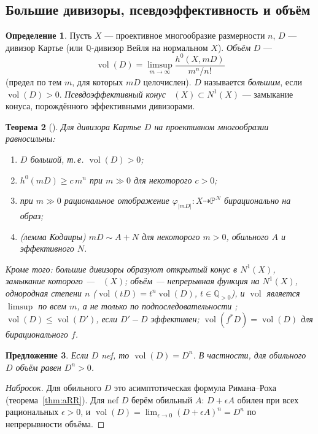 \documentclass[11pt,a4paper]{article}
\theoremstyle{plain}
\newtheorem{theorem}{Теорема}[section]
\newtheorem{proposition}[theorem]{Предложение}
\theoremstyle{definition}
\newtheorem{definition}[theorem]{Определение}
\theoremstyle{remark}
\newcommand{\Q}{\mathbb{Q}}
\newcommand{\PP}{\mathbb{P}}
\DeclareMathOperator{\vol}{vol}
\DeclareMathOperator{\Eff}{\overline{Eff}}
\begin{document}
\subsection{Большие дивизоры, псевдоэффективность и объём}\label{ss:volume}

\begin{definition}\label{def:big}
Пусть $X$ --- проективное многообразие размерности $n$, $D$ --- дивизор Картье (или $\Q$-дивизор
Вейля на нормальном $X$). \emph{Объём} $D$ ---
\[
\vol(D)=\limsup_{m\to\infty}\frac{h^0(X,mD)}{m^n/n!}
\]
(предел по тем $m$, для которых $mD$ целочислен). $D$ называется \emph{большим}, если
$\vol(D)>0$. \emph{Псевдоэффективный конус} $\Eff(X)\subset N^1(X)$ --- замыкание конуса,
порождённого эффективными дивизорами.
\end{definition}

\begin{theorem}[{\cite[2.2]{La}}]\label{thm:big}
Для дивизора Картье $D$ на проективном многообразии равносильны:
\begin{enumerate}
\item $D$ большой, т.\,е. $\vol(D)>0$;
\item $h^0(mD)\ge c\,m^n$ при $m\gg0$ для некоторого $c>0$;
\item при $m\gg0$ рациональное отображение $\varphi_{|mD|}\colon X\dashrightarrow\PP^N$ бирационально
на образ;
\item \textup{(}\emph{лемма Кодаиры}\textup{)} $mD\sim A+N$ для некоторого $m>0$, обильного $A$ и эффективного $N$.
\end{enumerate}
Кроме того: большие дивизоры образуют открытый конус в $N^1(X)$, замыкание которого --- $\Eff(X)$;
объём --- непрерывная функция на $N^1(X)$, однородная степени $n$ \textup{(}$\vol(tD)=t^n\vol(D)$,
$t\in\Q_{>0}$\textup{)}, и $\vol$ является $\limsup$ по всем $m$, а не только по подпоследовательности
\cite[2.2.C]{La}; $\vol(D)\le\vol(D')$, если $D'-D$ эффективен; $\vol(f^*D)=\vol(D)$ для
бирационального $f$.
\end{theorem}

\begin{proposition}\label{prop:vol-nef}
Если $D$ nef, то $\vol(D)=D^n$. В частности, для обильного $D$ объём равен $D^n>0$.
\end{proposition}
\begin{proof}[Набросок]
Для обильного $D$ это асимптотическая формула Римана--Роха (теорема~\ref{thm:aRR}). Для nef $D$
берём обильный $A$: $D+\epsilon A$ обилен при всех рациональных $\epsilon>0$, и
$\vol(D)=\lim_{\epsilon\to0}(D+\epsilon A)^n=D^n$ по непрерывности объёма.
\end{proof}
\end{document}
